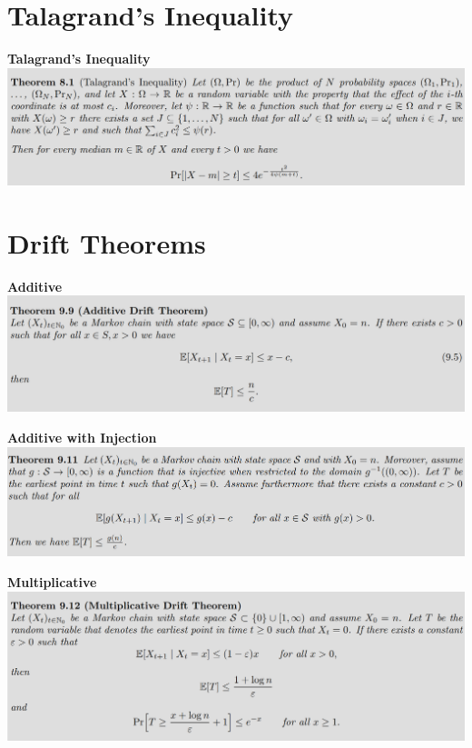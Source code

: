 \documentclass[25pt]{sciposter}
\begin{document}
\begin{multicols}{3}
\section{Talagrand's Inequality}
\textbf{Talagrand's Inequality}\\
\includegraphics[width=\linewidth]{screenshot005.png}



\section{Drift Theorems}
\textbf{Additive}\\
\includegraphics[width=\linewidth]{screenshot006}

\textbf{Additive with Injection}\\
\includegraphics[width=\linewidth]{screenshot008}

\textbf{Multiplicative}\\
\includegraphics[width=\linewidth]{screenshot009}




\end{multicols}
\end{document}
